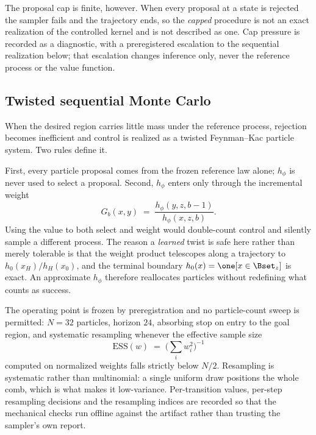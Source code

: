 The proposal cap is finite, however. When every proposal at a state is rejected the sampler fails and the trajectory ends, so the \emph{capped} procedure is not an exact realization of the controlled kernel and is not described as one. Cap pressure is recorded as a diagnostic, with a preregistered escalation to the sequential realization below; that escalation changes inference only, never the reference process or the value function.

\subsection{Twisted sequential Monte Carlo}

When the desired region carries little mass under the reference process, rejection becomes inefficient and control is realized as a twisted Feynman--Kac particle system. Two rules define it.

First, every particle proposal comes from the frozen reference law alone; $h_\phi$ is never used to select a proposal. Second, $h_\phi$ enters only through the incremental weight
\begin{equation}
G_b(x,y)\;=\;\frac{h_\phi(y,z,b-1)}{h_\phi(x,z,b)}.
\label{eq:fk}
\end{equation}
Using the value to both select and weight would double-count control and silently sample a different process. The reason a \emph{learned} twist is safe here rather than merely tolerable is that the weight product telescopes along a trajectory to $h_0(x_H)/h_H(x_0)$, and the terminal boundary $h_0(x)=\one[x\in\Bset_z]$ is exact. An approximate $h_\phi$ therefore reallocates particles without redefining what counts as success.

The operating point is frozen by preregistration and no particle-count sweep is permitted: $N=32$ particles, horizon $24$, absorbing stop on entry to the goal region, and systematic resampling whenever the effective sample size
\begin{equation*}
\mathrm{ESS}(w)\;=\;\Big(\textstyle\sum_i w_i^2\Big)^{-1}
\end{equation*}
computed on normalized weights falls strictly below $N/2$. Resampling is systematic rather than multinomial: a single uniform draw positions the whole comb, which is what makes it low-variance. Per-transition values, per-step resampling decisions and the resampling indices are recorded so that the mechanical checks run offline against the artifact rather than trusting the sampler's own report.

